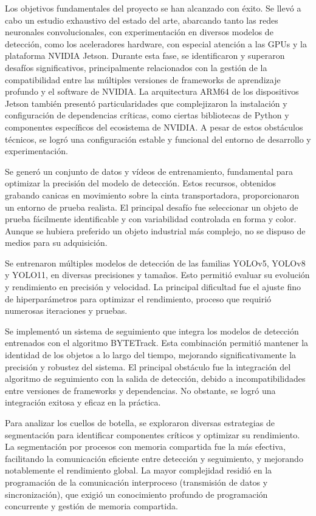 \documentclass[11pt,spanish,listoffigures,listoftables]{tfgetsinf}
\begin{document}
Los objetivos fundamentales del proyecto se han alcanzado con éxito. Se llevó a cabo un estudio exhaustivo del estado del arte, abarcando tanto las redes neuronales convolucionales, con experimentación en diversos modelos de detección, como los aceleradores hardware, con especial atención a las GPUs y la plataforma NVIDIA Jetson. Durante esta fase, se identificaron y superaron desafíos significativos, principalmente relacionados con la gestión de la compatibilidad entre las múltiples versiones de frameworks de aprendizaje profundo y el software de NVIDIA. La arquitectura ARM64 de los dispositivos Jetson también presentó particularidades que complejizaron la instalación y configuración de dependencias críticas, como ciertas bibliotecas de Python y componentes específicos del ecosistema de NVIDIA. A pesar de estos obstáculos técnicos, se logró una configuración estable y funcional del entorno de desarrollo y experimentación.

Se generó un conjunto de datos y vídeos de entrenamiento, fundamental para optimizar la precisión del modelo de detección. Estos recursos, obtenidos grabando canicas en movimiento sobre la cinta transportadora, proporcionaron un entorno de prueba realista. El principal desafío fue seleccionar un objeto de prueba fácilmente identificable y con variabilidad controlada en forma y color. Aunque se hubiera preferido un objeto industrial más complejo, no se dispuso de medios para su adquisición.

Se entrenaron múltiples modelos de detección de las familias YOLOv5, YOLOv8 y YOLO11, en diversas precisiones y tamaños. Esto permitió evaluar su evolución y rendimiento en precisión y velocidad. La principal dificultad fue el ajuste fino de hiperparámetros para optimizar el rendimiento, proceso que requirió numerosas iteraciones y pruebas.

Se implementó un sistema de seguimiento que integra los modelos de detección entrenados con el algoritmo BYTETrack. Esta combinación permitió mantener la identidad de los objetos a lo largo del tiempo, mejorando significativamente la precisión y robustez del sistema. El principal obstáculo fue la integración del algoritmo de seguimiento con la salida de detección, debido a incompatibilidades entre versiones de frameworks y dependencias. No obstante, se logró una integración exitosa y eficaz en la práctica.

Para analizar los cuellos de botella, se exploraron diversas estrategias de segmentación para identificar componentes críticos y optimizar su rendimiento. La segmentación por procesos con memoria compartida fue la más efectiva, facilitando la comunicación eficiente entre detección y seguimiento, y mejorando notablemente el rendimiento global. La mayor complejidad residió en la programación de la comunicación interproceso (transmisión de datos y sincronización), que exigió un conocimiento profundo de programación concurrente y gestión de memoria compartida.
\end{document}
